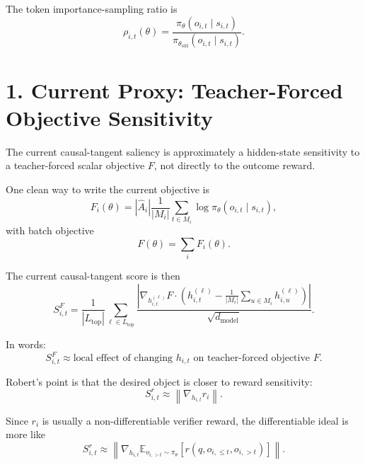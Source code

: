 \documentclass[11pt]{article}
\newcommand{\E}{\mathbb{E}}
\begin{document}
The token importance-sampling ratio is
\begin{equation}
  \rho_{i,t}(\theta)
  =
  \frac{
    \pi_\theta(o_{i,t} \mid s_{i,t})
  }{
    \pi_{\theta_{\mathrm{old}}}(o_{i,t} \mid s_{i,t})
  }.
\end{equation}

\section*{1. Current Proxy: Teacher-Forced Objective Sensitivity}

The current causal-tangent saliency is approximately a hidden-state sensitivity
to a teacher-forced scalar objective $F$, not directly to the outcome reward.

One clean way to write the current objective is
\begin{equation}
  F_i(\theta)
  =
  |\hat A_i|
  \frac{1}{|M_i|}
  \sum_{t \in M_i}
  \log \pi_\theta(o_{i,t} \mid s_{i,t}),
\end{equation}
with batch objective
\begin{equation}
  F(\theta)
  =
  \sum_i F_i(\theta).
\end{equation}

The current causal-tangent score is then
\begin{equation}
  S^{F}_{i,t}
  =
  \frac{1}{|L_{\mathrm{top}}|}
  \sum_{\ell \in L_{\mathrm{top}}}
  \frac{
    \left|
      \nabla_{h^{(\ell)}_{i,t}} F
      \cdot
      \left(
        h^{(\ell)}_{i,t}
        -
        \frac{1}{|M_i|}
        \sum_{u \in M_i} h^{(\ell)}_{i,u}
      \right)
    \right|
  }{\sqrt{d_{\mathrm{model}}}}.
\end{equation}

In words:
\begin{equation}
  S^{F}_{i,t}
  \approx
  \text{local effect of changing } h_{i,t}
  \text{ on teacher-forced objective } F.
\end{equation}

Robert's point is that the desired object is closer to reward sensitivity:
\begin{equation}
  S^{r}_{i,t}
  \approx
  \left\|
    \nabla_{h_{i,t}} r_i
  \right\|.
\end{equation}

Since $r_i$ is usually a non-differentiable verifier reward, the differentiable
ideal is more like
\begin{equation}
  S^{r}_{i,t}
  \approx
  \left\|
    \nabla_{h_{i,t}}
    \E_{o_{i,>t} \sim \pi_\theta}
    \left[
      r(q, o_{i,\le t}, o_{i,>t})
    \right]
  \right\|.
\end{equation}
\end{document}
